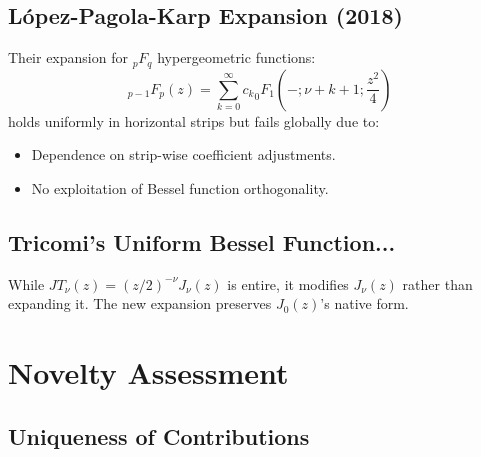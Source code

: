 \documentclass{article}
\begin{document}
\subsection*{L{\'o}pez-Pagola-Karp Expansion (2018)}

Their expansion for $_p F_q$ hypergeometric functions:
\[ _{p - 1} F_p (z) = \sum_{k = 0}^{\infty} {c_k}_0 F_1 \left( - ; \nu + k + 1
   ; \frac{z^2}{4} \right) \]
holds uniformly in horizontal strips but fails globally due to:
\begin{itemize}
  \item Dependence on strip-wise coefficient adjustments.
  
  \item No exploitation of Bessel function orthogonality.
\end{itemize}

\subsection*{Tricomi's Uniform Bessel Function...}

While $JT_{\nu} (z) = (z / 2)^{- \nu} J_{\nu} (z)$ is entire, it modifies
$J_{\nu} (z)$ rather than expanding it. The new expansion preserves $J_0
(z)$'s native form.

\section*{Novelty Assessment}

\subsection*{Uniqueness of Contributions}
\end{document}
